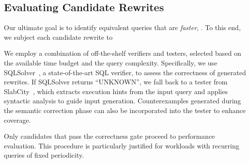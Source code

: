 
\subsection{Evaluating Candidate Rewrites}
\label{gen:sec:approach:evaluate}


Our ultimate goal is to identify equivalent queries that are \emph{faster}, . To this end, we subject each candidate rewrite to 

 We employ a combination of off-the-shelf verifiers and testers, selected based on the available time budget and the query complexity. Specifically, we use SQLSolver~\cite{ding2023proving}, a state-of-the-art SQL verifier, to assess the correctness of generated rewrites. If SQLSolver returns ``UNKNOWN'', we fall back to a tester from SlabCity~\cite{dong2023slabcity}, which extracts execution hints from the input query and applies syntactic analysis to guide input generation. Counterexamples generated during the semantic correction phase can also be incorporated into the tester to enhance coverage. 

 Only candidates that pass the correctness gate proceed to performance evaluation.  This procedure is particularly justified for workloads with recurring queries of fixed periodicity. 





